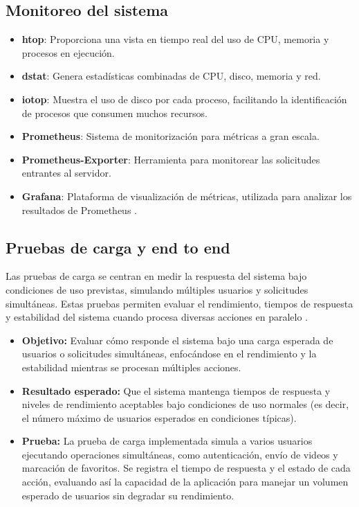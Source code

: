 \subsection{Monitoreo del sistema}
\begin{itemize}
    \item \textbf{htop}: Proporciona una vista en tiempo real del uso de CPU, memoria y procesos en ejecución.
    \item \textbf{dstat}: Genera estadísticas combinadas de CPU, disco, memoria y red.
    \item \textbf{iotop}: Muestra el uso de disco por cada proceso, facilitando la identificación de procesos que consumen muchos recursos.
    \item \textbf{Prometheus}: Sistema de monitorización para métricas a gran escala.
    \item \textbf{Prometheus-Exporter}: Herramienta para monitorear las solicitudes entrantes al servidor.
    \item \textbf{Grafana}: Plataforma de visualización de métricas, utilizada para analizar los resultados de Prometheus \cite{MonitoringTools}.
\end{itemize}

\subsection{Pruebas de carga y end to end}

Las pruebas de carga se centran en medir la respuesta del sistema bajo condiciones de uso previstas, simulando múltiples usuarios y solicitudes simultáneas. Estas pruebas permiten evaluar el rendimiento, tiempos de respuesta y estabilidad del sistema cuando procesa diversas acciones en paralelo \cite{LoadViewLoadTesting}.

\begin{itemize} 
\item \textbf{Objetivo:} Evaluar cómo responde el sistema bajo una carga esperada de usuarios o solicitudes simultáneas, enfocándose en el rendimiento y la estabilidad mientras se procesan múltiples acciones. \item \textbf{Resultado esperado:} Que el sistema mantenga tiempos de respuesta y niveles de rendimiento aceptables bajo condiciones de uso normales (es decir, el número máximo de usuarios esperados en condiciones típicas). 
\item \textbf{Prueba:} La prueba de carga implementada simula a varios usuarios ejecutando operaciones simultáneas, como autenticación, envío de videos y marcación de favoritos. Se registra el tiempo de respuesta y el estado de cada acción, evaluando así la capacidad de la aplicación para manejar un volumen esperado de usuarios sin degradar su rendimiento. 
\end{itemize}

